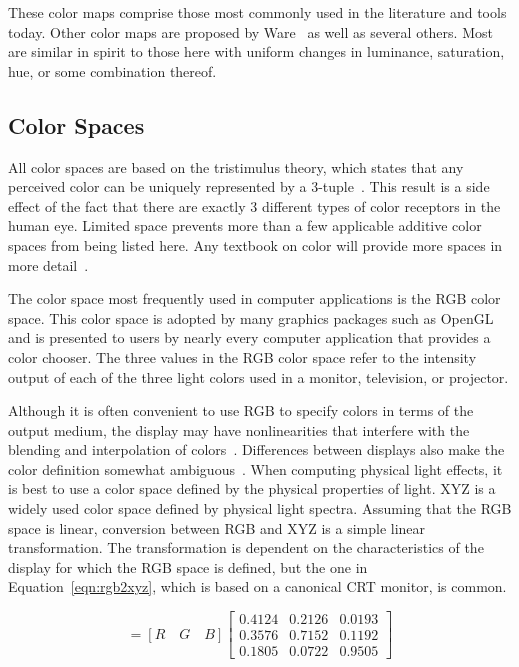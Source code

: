 \documentclass{acmsiggraph}               %
\newcommand{\lcite}[1]{~\cite{#1}}
\newcommand{\scite}[1]{~\shortcite{#1}}
\newcommand{\RGB}{RGB\xspace}
\newcommand{\XYZ}{XYZ\xspace}
\begin{document}
These color maps comprise those most commonly used in the literature and tools
today.  Other color maps are proposed by Ware\scite{Ware04} as well as
several others.  Most are similar in spirit to those here with uniform
changes in luminance, saturation, hue, or some combination thereof.

\subsection{Color Spaces}
\label{sec:PreviousWork:ColorSpaces}

All color spaces are based on the tristimulus theory, which states that any
perceived color can be uniquely represented by a
3-tuple\lcite{Stone03}.  This result is a side effect
of the fact that there are exactly 3 different types of color receptors in
the human eye.  Limited space prevents more than a few applicable additive
color spaces from being listed here.  Any textbook on color will provide
more spaces in more detail\lcite{Stone03,Wyszecki82}.

The color space most frequently used in computer applications is the \RGB
color space.  This color space is adopted by many graphics packages such as
OpenGL and is presented to users by nearly every computer application
that provides a color chooser.  The three values in the \RGB
color space refer to the intensity output of each of the three light colors
used in a monitor, television, or projector.

Although it is often convenient to use \RGB to specify colors in terms of
the output medium, the display may have nonlinearities that interfere with
the blending and interpolation of colors\lcite{Stone03}.  Differences
between displays also make the color definition somewhat
ambiguous\lcite{Fortner97}.  When computing physical light effects, it is
best to use a color space defined by the physical properties of light.
\XYZ is a widely used color space defined by physical light
spectra.  Assuming that the \RGB space is linear, conversion between \RGB
and \XYZ is a simple linear transformation.  The transformation is
dependent on the characteristics of the display for which the \RGB space is
defined, but the one in Equation~\ref{eqn:rgb2xyz}, which is based on a
canonical CRT monitor, is common.

\begin{equation}
  [X \quad Y \quad Z] = [R \quad G \quad B]
  \begin{bmatrix}
    0.4124 & 0.2126 & 0.0193 \\
    0.3576 & 0.7152 & 0.1192 \\
    0.1805 & 0.0722 & 0.9505
  \end{bmatrix}
  \label{eqn:rgb2xyz}
\end{equation}
\end{document}

